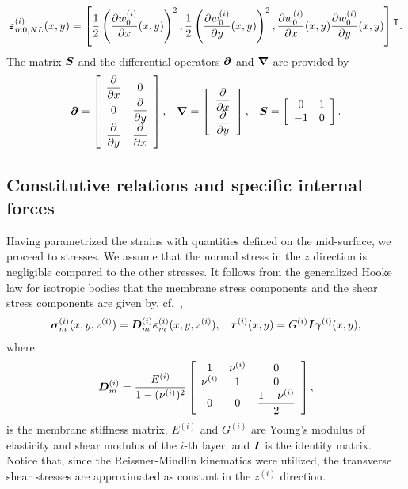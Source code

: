 \documentclass[11pt]{article}
\newcommand{\strain}{\varepsilon}
\newcommand{\sstrain}{\gamma}
\newcommand{\m}{_m}
\newcommand{\mONL}{_{m0,NL}}
\newcommand{\Dm}{\mtrx{D}_m}
\newcommand{\stress}{\sigma}
\newcommand{\sstress}{\tau}
\newcommand{\del}[2]{\mbox{$\displaystyle\frac{#1}{#2}$}}
\newcommand{\ppd}[2]{\del{\partial {#1}}{\partial{#2}}}
\newcommand{\layer}[1]{^{(#1)}}
\newcommand{\lay}[1]{^{(#1)}}
\newcommand{\I}{\mtrx{I}}
\begin{document}
\begin{align}
\mtrx{\strain}\mONL\layer{i}(x,y) =\left[\frac{1}{2} \left( \ppd{w_0\layer{i}}{x}(x,y)\right)^2, \frac{1}{2} \left( \ppd{w_0\layer{i}}{y}(x,y)\right)^2, \ppd{w_0\layer{i}}{x}(x,y) \ppd{w_0\layer{i}}{y}(x,y)\right]\trn.
\label{eq:strain_NL}
\end{align}
The matrix ${\boldsymbol{S}}$ and the differential operators ${\boldsymbol{\partial}}$ and
${\boldsymbol{\nabla}}$ are provided by
\begin{align}
\pard = 
	\left[
	\begin{array}{cc}
	\ppd{}{x} & 0 \\ 0 & \ppd{}{y} \\ \ppd{}{y} & \ppd{}{x}
	\end{array}
	\right],
&&
\mtrx{\nabla} =
	\left[
	\begin{array}{c}
\ppd{}{x} \\
\ppd{}{y}
	\end{array}
   \right],
&&
\mtrx{S} =
	\left[
	\begin{array}{cc}
	0 & 1 \\ -1 & 0
	\end{array}
	\right].
\end{align}

\subsection{Constitutive relations and specific internal forces}\label{sec:constitutive}
Having parametrized the strains with quantities defined on the mid-surface, we
proceed to stresses. We assume that the normal stress in the $z$ direction is negligible compared to the other stresses. It follows from the generalized Hooke law for isotropic
bodies that the membrane stress components and the shear stress components are given by, cf.~\citep{Pica:1980:FEA},
\begin{align}\label{eq5:stress_strain_membrane}
\mtrx{\stress}\layer{i}_{m} (x,y,z\layer{i}) = \Dm\layer{i} \mtrx{\strain}\m\layer{i}(x,y,z\layer{i}),
&&
\mtrx{\sstress}\layer{i} (x,y) = G\layer{i} \I \mtrx{\sstrain}\layer{i}(x,y),
\end{align}
where
\begin{align}
\Dm\layer{i} = \frac{E\layer{i}}{1-(\nu\layer{i})^2}
\left[
	\begin{array}{ccc}
	1 & \nu\layer{i} & 0\\
	\nu\layer{i} & 1 & 0\\
	0 & 0 & \displaystyle{\frac{1-\nu\layer{i}}{2}}
	\end{array}
\right],
\end{align}
is the membrane stiffness matrix, $E\layer{i}$ and $G\layer{i}$ are Young's modulus of elasticity and shear modulus of the $i$-th layer, and $\I$ is the identity matrix. Notice that, since the Reissner-Mindlin kinematics were utilized, the transverse shear stresses are approximated as constant in the $z\lay{i}$ direction.
\end{document}
